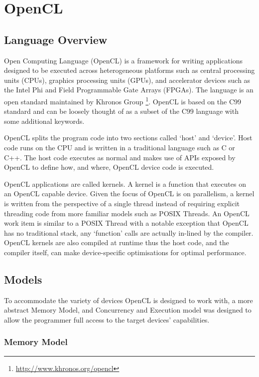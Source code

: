 \section{OpenCL}

\subsection{Language Overview}

Open Computing Language (OpenCL) is a framework for writing applications
designed to be executed across heterogeneous platforms such as central
processing units (CPUs), graphics processing units (GPUs), and accelerator
devices such as the Intel Phi and Field Programmable Gate Arrays (FPGAs). The
language is an open standard maintained by Khronos Group
\footnote{\url{http://www.khronos.org/opencl}}. OpenCL is based on the C99
standard and can be loosely thought of as a subset of the C99 language with some
additional keywords.

OpenCL splits the program code into two sections called `host' and `device'.
Host code runs on the CPU and is written in a traditional language such as C or
C++. The host code executes as normal and makes use of APIs exposed by OpenCL to
define how, and where, OpenCL device code is executed.

OpenCL applications are called kernels. A kernel is a function that executes on
an OpenCL capable device. Given the focus of OpenCL is on parallelism, a kernel
is written from the perspective of a single thread instead of requiring explicit
threading code from more familiar models such as POSIX Threads. An OpenCL work
item is similar to a POSIX Thread with a notable exception that OpenCL has no
traditional stack, any `function' calls are actually in-lined by the compiler.
OpenCL kernels are also compiled at runtime thus the host code, and the compiler
itself, can make device-specific optimisations for optimal performance.

\subsection{Models}

To accommodate the variety of devices OpenCL is designed to work with, a more
abstract Memory Model, and Concurrency and Execution model was designed to allow
the programmer full access to the target devices' capabilities.

\subsubsection{Memory Model}

